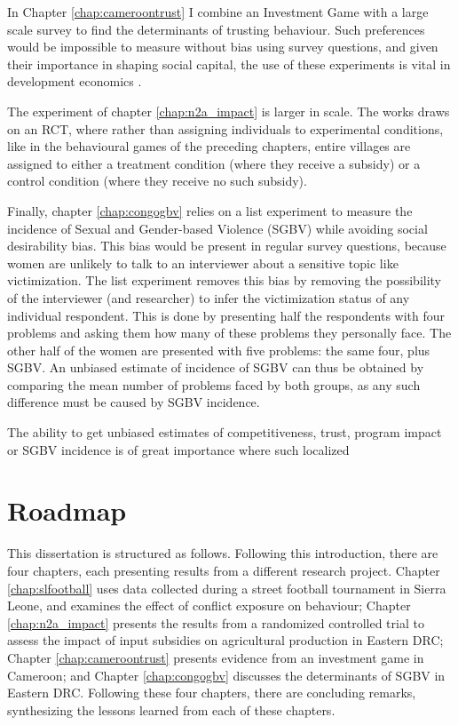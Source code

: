In Chapter \ref{chap:cameroontrust} I combine an Investment Game \citep{Berg1995} with a large scale survey to find the determinants of trusting behaviour. Such preferences would be impossible to measure without bias using survey questions, and given their importance in shaping social capital, the use of these experiments is vital in development economics \citep[see e.g]{Camerer1995, Cardenas2008a}.

The experiment of chapter \ref{chap:n2a_impact} is larger in scale. The works draws on an RCT, where rather than assigning individuals to experimental conditions, like in the behavioural games of the preceding chapters, entire villages are assigned to either a treatment condition (where they receive a subsidy) or a control condition (where they receive no such subsidy).

Finally, chapter \ref{chap:congogbv} relies on a list experiment to measure the incidence of Sexual and Gender-based Violence (SGBV) while avoiding social desirability bias. This bias would be present in regular survey questions, because women are unlikely to talk to an interviewer about a sensitive topic like victimization. The list experiment removes this bias by removing the possibility of the interviewer (and researcher) to infer the victimization status of any individual respondent. This is done by presenting half the respondents with four problems and asking them how many of these problems they personally face. The other half of the women are presented with five problems: the same four, plus SGBV. An unbiased estimate of incidence of SGBV can thus be obtained by comparing the mean number of problems faced by both groups, as any such difference must be caused by SGBV incidence. 

The ability to get unbiased estimates of competitiveness, trust, program impact or SGBV incidence is of great importance where such localized 

\section{Roadmap}
This dissertation is structured as follows. Following this introduction, there are four chapters, each presenting results from a different research project. Chapter \ref{chap:slfootball} uses data collected during a street football tournament in Sierra Leone, and examines the effect of conflict exposure on behaviour; Chapter \ref{chap:n2a_impact} presents the results from a randomized controlled trial to assess the impact of input subsidies on agricultural production in Eastern DRC; Chapter \ref{chap:cameroontrust} presents evidence from an investment game in Cameroon; and Chapter \ref{chap:congogbv} discusses the determinants of SGBV in Eastern DRC. Following these four chapters, there are concluding remarks, synthesizing the lessons learned from each of these chapters.



\clearpage 

